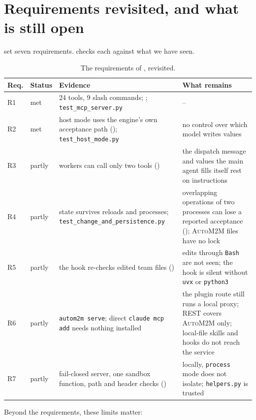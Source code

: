 \documentclass[10pt,a4paper]{article}
\newcommand{\auto}{\textsc{AutoM2M}}
\newcommand{\code}[1]{\texttt{#1}}
\newcommand{\file}[1]{\texttt{#1}}
\begin{document}
\section{Requirements revisited, and what is still open}\label{sec:limits}

 set seven requirements.  checks each
against what we have seen.

\begin{table}[!htb]
\centering\small
\caption{The requirements of , revisited.}
\label{tab:revisit}
\begin{tabularx}{\textwidth}{@{}l l Y Y@{}}
\toprule
{}Req. & Status & Evidence & What remains \\
\midrule
R1 & met & 24 tools, 9 slash commands; ; \file{test_mcp_server.py} & -- \\
R2 & met & host mode uses the engine's own acceptance path (); \file{test_host_mode.py} & no control over which model writes values \\
R3 & partly & workers can call only two tools () & the dispatch message and values the main agent fills itself rest on instructions \\
R4 & partly & state survives reloads and processes; \file{test_change_and_persistence.py} & overlapping operations of two processes can lose a reported acceptance (); \auto{} files have no lock \\
R5 & partly & the hook re-checks edited team files () & edits through \code{Bash} are not seen; the hook is silent without \code{uvx} or \code{python3} \\
R6 & partly & \code{autom2m serve}; direct \code{claude mcp add} needs nothing installed & the plugin route still runs a local proxy; REST covers \auto{} only; local-file skills and hooks do not reach the service \\
R7 & partly & fail-closed server, one sandbox function, path and header checks () & locally, \code{process} mode does not isolate; \file{helpers.py} is trusted \\
\bottomrule
\end{tabularx}
\end{table}

Beyond the requirements, these limits matter:
\end{document}

